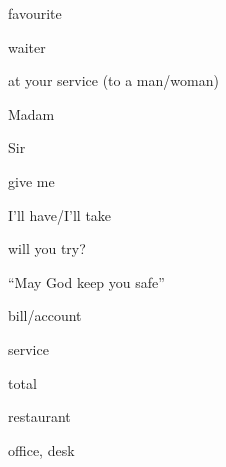 \begin{flashcard}{\LARGE favourite}
\LARGE {}
\end{flashcard}
\begin{flashcard}{\LARGE waiter}
\LARGE {}
\end{flashcard}
\begin{flashcard}{\LARGE at your service (to a man/woman)}
\LARGE {}
\end{flashcard}
\begin{flashcard}{\LARGE Madam}
\LARGE {}
\end{flashcard}
\begin{flashcard}{\LARGE Sir}
\LARGE {}
\end{flashcard}
\begin{flashcard}{\LARGE give me}
\LARGE {}
\end{flashcard}
\begin{flashcard}{\LARGE I'll have/I'll take}
\LARGE {}
\end{flashcard}
\begin{flashcard}{\LARGE will you try?}
\LARGE {}
\end{flashcard}
\begin{flashcard}{\LARGE ``May God keep you safe''}
\LARGE {}
\end{flashcard}
\begin{flashcard}{\LARGE bill/account}
\LARGE {}
\end{flashcard}
\begin{flashcard}{\LARGE service}
\LARGE {}
\end{flashcard}
\begin{flashcard}{\LARGE total}
\LARGE {}
\end{flashcard}
\begin{flashcard}{\LARGE restaurant}
\LARGE {}
\end{flashcard}
\begin{flashcard}{\LARGE office, desk}
\LARGE {}
\end{flashcard}

